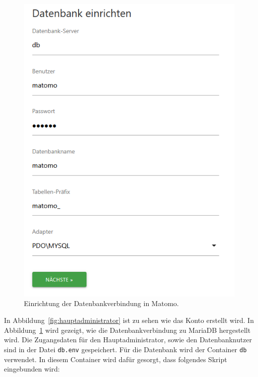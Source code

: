 \begin{figure}[H]
\begin{minipage}{0.49\textwidth}
        \includegraphics[width=\linewidth, keepaspectratio]{images/setup-datenbank.png}
        \caption{Einrichtung der Datenbankverbindung in Matomo.}
        \label{fig:setup-datenbank}
    \end{minipage}
\end{figure}

In Abbildung~\ref{fig:hauptadministrator} ist zu sehen wie das Konto erstellt wird. In Abbildung~\ref{fig:setup-datenbank} wird gezeigt, wie die Datenbankverbindung zu MariaDB hergestellt wird. Die Zugangsdaten für den Hauptadministrator, sowie den Datenbanknutzer sind in der Datei \texttt{db.env} gespeichert. Für die Datenbank wird der Container \texttt{db} verwendet. In diesem Container wird dafür gesorgt, dass folgendes Skript eingebunden wird: 

\begin{figure}[H]
    \centering
    \begin{minipage}{\textwidth}
        
    \end{minipage}
\end{figure}

